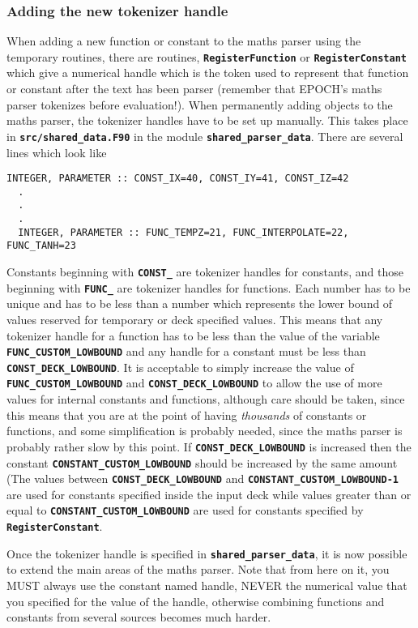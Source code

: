 \documentclass[12pt,a4paper]{article}
\newcommand{\simpleboxverbatim}{\begin{Verbatim}[obeytabs=true,frame=single,
  framerule=0.5mm,rulecolor=\color{warwickmid},formatcom=\color{black}]}
\newcommand{\inlinecode}[1]{{\color{warwickred} \bf\texttt{#1}}}
\begin{document}
\subsubsection{Adding the new tokenizer handle}
When adding a new function or constant to the maths parser using the temporary
routines, there are routines, \inlinecode{RegisterFunction} or
\inlinecode{RegisterConstant} which give a numerical handle which is the token
used to represent that function or constant after the text has been parser
(remember that EPOCH's maths parser tokenizes before evaluation!). When
permanently adding objects to the maths parser, the tokenizer handles have to
be set up manually. This takes place in \inlinecode{src/shared\_data.F90} in
the module \inlinecode{shared\_parser\_data}. There are several lines which
look like
\simpleboxverbatim
  INTEGER, PARAMETER :: CONST_IX=40, CONST_IY=41, CONST_IZ=42
  .
  .
  .
  INTEGER, PARAMETER :: FUNC_TEMPZ=21, FUNC_INTERPOLATE=22, FUNC_TANH=23
\end{Verbatim}
Constants beginning with \inlinecode{CONST\_} are tokenizer handles for
constants, and those beginning with \inlinecode{FUNC\_} are tokenizer handles
for functions. Each number has to be unique and has to be less than a number
which represents the lower bound of values reserved for temporary or deck
specified values. This means that any tokenizer handle for a function has to be
less than the value of the variable \inlinecode{FUNC\_CUSTOM\_LOWBOUND} and any
handle for a constant must be less than \inlinecode{CONST\_DECK\_LOWBOUND}. It
is acceptable to simply increase the value of
\inlinecode{FUNC\_CUSTOM\_LOWBOUND} and \inlinecode{CONST\_DECK\_LOWBOUND} to
allow the use of more values for internal constants and functions, although
care should be taken, since this means that you are at the point of having {\it
thousands} of constants or functions, and some simplification is probably
needed, since the maths parser is probably rather slow by this point. If
\inlinecode{CONST\_DECK\_LOWBOUND} is increased then the constant
\inlinecode{CONSTANT\_CUSTOM\_LOWBOUND} should be increased by the same amount
(The values between \inlinecode{CONST\_DECK\_LOWBOUND} and
\inlinecode{CONSTANT\_CUSTOM\_LOWBOUND-1} are used for constants specified
inside the input deck while values greater than or equal to
\inlinecode{CONSTANT\_CUSTOM\_LOWBOUND} are used for constants specified by
\inlinecode{RegisterConstant}.

Once the tokenizer handle is specified in \inlinecode{shared\_parser\_data}, it
is now possible to extend the main areas of the maths parser. Note that from
here on it, you MUST always use the constant named handle, NEVER the numerical
value that you specified for the value of the handle, otherwise combining
functions and constants from several sources becomes much harder.
\end{document}
